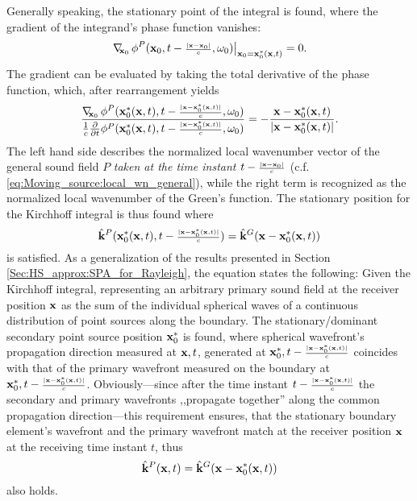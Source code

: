 Generally speaking, the stationary point of the integral is found, where the gradient of the integrand's phase function vanishes:
\begin{equation}
\left. \nabla_{\!\!\mathbf{x}_0}\, \phi^P(\mathbf{x}_0,t-{\scriptstyle \frac{|\mathbf{x}-\mathbf{x}_0|}{c} },\omega_0) \right|_{\mathbf{x}_0 = \mathbf{x}_0^*(\mathbf{x},t)} = 0.
\end{equation} 
The gradient can be evaluated by taking the total derivative of the phase function, which, after rearrangement yields
\begin{equation}
\frac{\nabla_{\!\!\mathbf{x}_0}\, \phi^P(\mathbf{x}_0^*(\mathbf{x},t),t-{\scriptstyle \frac{|\mathbf{x}-\mathbf{x}_0^*(\mathbf{x},t)|}{c} },\omega_0) }{\frac{1}{c}\frac{\partial }{\partial t}\phi^P(\mathbf{x}_0^*(\mathbf{x},t),t-{\scriptstyle \frac{|\mathbf{x}-\mathbf{x}_0^*(\mathbf{x},t)|}{c} },\omega_0) } = - \frac{\mathbf{x}-\mathbf{x}_0^*(\mathbf{x},t)}{|\mathbf{x}-\mathbf{x}_0^*(\mathbf{x},t)|}.
\end{equation}
The left hand side describes the normalized local wavenumber vector of the general sound field $P$ \emph{taken at the time instant $t-{\scriptstyle \frac{|\mathbf{x}-\mathbf{x}_0|}{c} }$} (c.f. \eqref{eq:Moving_source:local_wn_general}), while the right term is recognized as the normalized local wavenumber of the Green's function. 
The stationary position for the Kirchhoff integral is thus found where
\begin{equation}
\label{Eq:moving_sources:moving_point_stat_point_1}
\hat{\mathbf{k}}^P(\mathbf{x}_0^*(\mathbf{x},t),t-{\scriptstyle \frac{|\mathbf{x}-\mathbf{x}_0^*(\mathbf{x},t)|}{c} }) = \hat{\mathbf{k}}^G(\mathbf{x}-\mathbf{x}_0^*(\mathbf{x},t))
\end{equation}
is satisfied.
As a generalization of the results presented in Section \ref{Sec:HS_approx:SPA_for_Rayleigh}, the equation states the following:
Given the Kirchhoff integral, representing an arbitrary primary sound field at the receiver position $\mathbf{x}$ as the sum of the individual spherical waves of a continuous distribution of point sources along the boundary. 
The stationary/dominant secondary point source position $\mathbf{x}_0^*$ is found, where spherical wavefront's propagation direction measured at $\mathbf{x},t$, generated at $\mathbf{x}_0^*, t-{\scriptstyle \frac{|\mathbf{x}-\mathbf{x}_0^*(\mathbf{x},t)|}{c} }$ coincides with that of the primary wavefront measured on the boundary at $\mathbf{x}_0^*, t-{\scriptstyle \frac{|\mathbf{x}-\mathbf{x}_0^*(\mathbf{x},t)|}{c} }$.
Obviously---since after the time instant $t-{\scriptstyle \frac{|\mathbf{x}-\mathbf{x}_0^*(\mathbf{x},t)|}{c} }$ the secondary and primary wavefronts ,,propagate together'' along the common propagation direction---this requirement ensures, that the stationary boundary element's wavefront and the primary wavefront match at the receiver position $\mathbf{x}$ at the receiving time instant $t$, thus 
\begin{equation}
\hat{\mathbf{k}}^P(\mathbf{x},t) = \hat{\mathbf{k}}^G(\mathbf{x}-\mathbf{x}_0^*(\mathbf{x},t))
\end{equation}
also holds.
%
